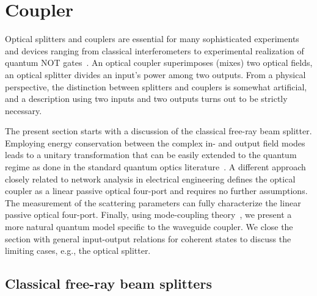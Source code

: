 \section{Coupler}

Optical splitters and couplers are essential for many sophisticated experiments and devices ranging from classical interferometers to experimental realization of quantum NOT gates~\cite{Adami1998}.
An optical coupler superimposes (mixes) two optical fields, an optical splitter divides an input's power among two outputs.
From a physical perspective, the distinction between splitters and couplers is somewhat artificial, and a description using two inputs and two outputs turns out to be strictly necessary.

The present section starts with a discussion of the classical free-ray beam splitter. Employing energy conservation between the complex in- and output field modes leads to a unitary transformation that can be easily extended to the quantum regime as done in the standard quantum optics literature~\cite{Leonhardt2010,Gerry2005,Loudon2000}.
A different approach closely related to network analysis in electrical engineering defines the optical coupler as a linear passive optical four-port and requires no further assumptions.
The measurement of the scattering parameters can fully characterize the linear passive optical four-port.
Finally, using mode-coupling theory~\cite[p.~359]{Luks2009}, we present a more natural quantum model specific to the waveguide coupler.
We close the section with general input-output relations for coherent states to discuss the limiting cases, e.g., the optical splitter.

\subsection{Classical free-ray beam splitters}

